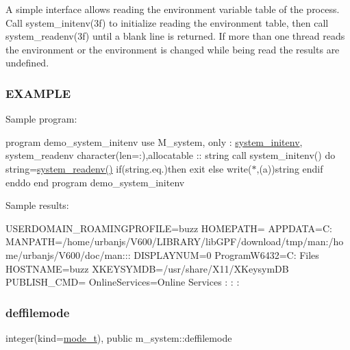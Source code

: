 A simple interface allows reading the environment variable table of the process. Call system\+\_\+initenv(3f) to initialize reading the environment table, then call system\+\_\+readenv(3f) until a blank line is returned. If more than one thread reads the environment or the environment is changed while being read the results are undefined.

\subsubsection*{E\+X\+A\+M\+P\+LE}

Sample program\+:

program demo\+\_\+system\+\_\+initenv use M\+\_\+system, only \+: \mbox{\hyperlink{interfacem__system_1_1system__initenv}{system\+\_\+initenv}}, system\+\_\+readenv character(len=\+:),allocatable \+:\+: string call system\+\_\+initenv() do string=\mbox{\hyperlink{namespacem__system_ae0e43010a82a6a25402568ccb326322d}{system\+\_\+readenv()}} if(string.\+eq.\textquotesingle{}\textquotesingle{})then exit else write($\ast$,\textquotesingle{}(a)\textquotesingle{})string endif enddo end program demo\+\_\+system\+\_\+initenv

Sample results\+:

U\+S\+E\+R\+D\+O\+M\+A\+I\+N\+\_\+\+R\+O\+A\+M\+I\+N\+G\+P\+R\+O\+F\+I\+LE=buzz H\+O\+M\+E\+P\+A\+TH= A\+P\+P\+D\+A\+TA=C\+: M\+A\+N\+P\+A\+TH=/home/urbanjs/\+V600/\+L\+I\+B\+R\+A\+R\+Y/lib\+G\+P\+F/download/tmp/man\+:/home/urbanjs/\+V600/doc/man\+:\+:\+: D\+I\+S\+P\+L\+A\+Y\+N\+UM=0 Program\+W6432=C\+: Files H\+O\+S\+T\+N\+A\+ME=buzz X\+K\+E\+Y\+S\+Y\+M\+DB=/usr/share/\+X11/\+X\+Keysym\+DB P\+U\+B\+L\+I\+S\+H\+\_\+\+C\+MD= Online\+Services=Online Services \+: \+: \+: \mbox{\label{namespacem__system_a04a5b1ef384bcbb8ad3b0c81ce95001a}} 
\subsubsection{\texorpdfstring{deffilemode}{deffilemode}}
{\footnotesize\ttfamily integer(kind=\mbox{\hyperlink{namespacem__system_abdb5cc27c945379d844db4830d499050}{mode\+\_\+t}}), public m\+\_\+system\+::deffilemode}

\mbox{\label{namespacem__system_ad34c4f18dd5b7dbe445cca25bbae9a74}} 
